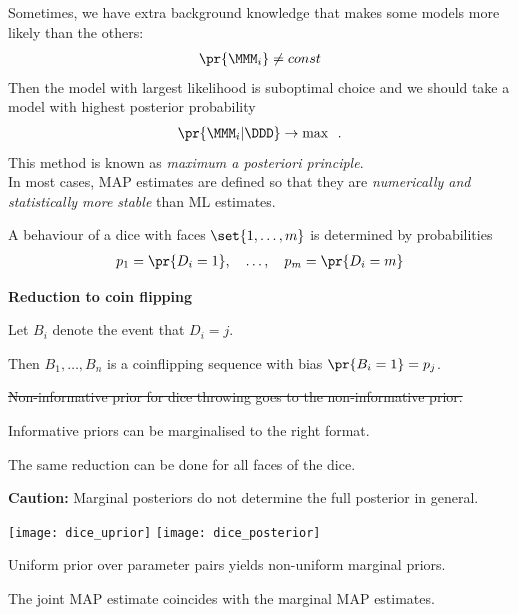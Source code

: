 \documentclass[landscape,footrule]{foils}
\begin{document}
Sometimes, we have extra background knowledge that makes some models
more likely than the others:
\begin{align*}
  \pr{\MMM_i}\neq const
\end{align*}
Then the model with largest likelihood is suboptimal choice and we
should take a model with highest posterior probability
\begin{align*}
  \pr{\MMM_i|\DDD}\to\max\enspace.
\end{align*}
This method is known as \emph{maximum a posteriori principle}.\\

In most cases, MAP estimates are defined so that they are
\emph{numerically and statistically more stable} than ML estimates.




A behaviour of a dice with faces $\set{1,\ldots,m}$ is determined by probabilities 
\begin{align*}
p_1=\pr{D_i=1},\quad\ldots,\quad p_m=\pr{D_i=m}
\end{align*}

\textbf{Reduction to coin flipping} 
\begin{triangles}
\item Let $B_i$ denote the event that $D_i=j$.
\item Then $B_1,\ldots, B_n$ is a coinflipping sequence with bias $\pr{B_i=1}=p_j$.
\item \colorbox{black!20}{\st{Non-informative prior for dice throwing goes to the non-informative prior.}}
\item Informative priors can be marginalised to the right format.
\item The same reduction can be done for all faces of the dice.    
\end{triangles} 
\vspace*{1cm}

\textbf{Caution:} Marginal posteriors do not determine the full posterior in general.


\centerline{
\texttt{[image: dice\_uprior]}\hspace*{1cm}
\texttt{[image: dice\_posterior]}}

\begin{triangles}
\item Uniform prior over parameter pairs yields non-uniform marginal priors.
\item The joint MAP estimate coincides with the marginal MAP estimates.  
\end{triangles}
\end{document}
